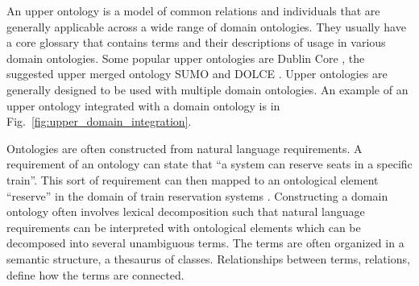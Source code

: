 An upper ontology is a model of common relations and individuals that are generally
applicable across a wide range of domain ontologies. They usually have
a core glossary that contains terms and their descriptions of usage in various 
domain ontologies. Some popular upper ontologies are Dublin Core \citep{weibel1998dublin}, 
the suggested upper merged ontology SUMO \citep{pease2002suggested} and
DOLCE \citep{gangemi2002sweetening}. 
Upper ontologies are generally designed to be used with multiple domain ontologies. 
An example of an upper ontology integrated with a domain ontology is in 
Fig.~\ref{fig:upper_domain_integration}. 


Ontologies are often constructed from natural language requirements. 
A requirement of an ontology can state that ``a system can reserve seats in a specific train''. 
This sort of requirement can
then mapped to an ontological element ``reserve'' in the domain of 
train reservation systems \citep{kaiya2006using}.
Constructing a domain ontology often involves lexical decomposition
\citep{pustejovsky2013type} such that natural language requirements 
can be interpreted with ontological elements which can be decomposed 
into several unambiguous terms. The terms are often organized in a semantic structure,
a thesaurus of classes. Relationships between terms, relations, define how 
the terms are connected. 


